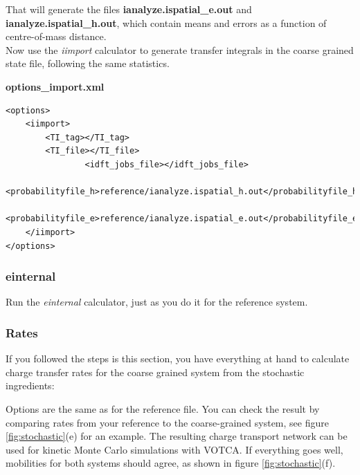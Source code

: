 That will generate the files \textbf{ianalyze.ispatial\_e.out} and \textbf{ianalyze.ispatial\_h.out}, which contain means and errors as a function of centre-of-mass distance.\\

Now use the \emph{iimport} calculator to generate transfer integrals in the coarse grained state file, following the same statistics.



\textbf{options\_import.xml}

\lstset{language=XML2}
\begin{lstlisting}
<options>
	<iimport>
		<TI_tag></TI_tag>
		<TI_file></TI_file>
                <idft_jobs_file></idft_jobs_file>
                <probabilityfile_h>reference/ianalyze.ispatial_h.out</probabilityfile_h>
                <probabilityfile_e>reference/ianalyze.ispatial_e.out</probabilityfile_e>
	</iimport>
</options>
\end{lstlisting}

\subsubsection{einternal}
Run the \emph{einternal} calculator, just as you do it for the reference system.

\subsubsection{Rates}
If you followed the steps is this section, you have everything at hand to calculate charge transfer rates for the coarse grained system from the stochastic ingredients:


Options are the same as for the reference file. You can check the result by comparing rates from your reference to the coarse-grained system, see figure \ref{fig:stochastic}(e) for an example. The resulting charge transport network can be used for kinetic Monte Carlo simulations with VOTCA. If everything goes well, mobilities for both systems should agree, as shown in figure \ref{fig:stochastic}(f).
